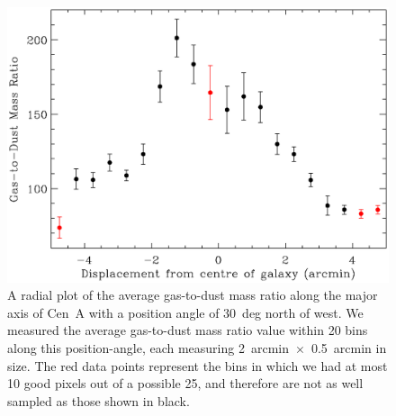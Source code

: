 \begin{figure}
\includegraphics[width=\columnwidth]{ch2/Fig8_CenA_G2D_radial_plot}
\caption[A radial plot of the average gas-to-dust mass ratio along the major axis of Centaurus~A]{A radial plot of the average gas-to-dust mass ratio along the major axis of Cen~A with a position angle of 30~deg north of west.  We measured the average gas-to-dust mass ratio value within 20 bins along this position-angle, each measuring 2~arcmin~$\times$~0.5~arcmin in size.  The red data points represent the bins in which we had at most 10 good pixels out of a possible 25, and therefore are not as well sampled as those shown in black.}
\label{fig:g2d_radial}
\end{figure}


